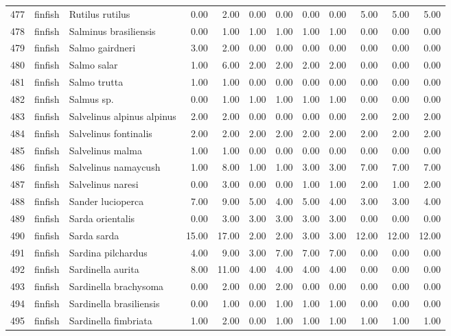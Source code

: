 \begin{table}[ht]
\begin{tabular}{rllrrrrrrrrr}
  477 & finfish & Rutilus rutilus & 0.00 & 2.00 & 0.00 & 0.00 & 0.00 & 0.00 & 5.00 & 5.00 & 5.00 \\ 
  478 & finfish & Salminus brasiliensis & 0.00 & 1.00 & 1.00 & 1.00 & 1.00 & 1.00 & 0.00 & 0.00 & 0.00 \\ 
  479 & finfish & Salmo gairdneri & 3.00 & 2.00 & 0.00 & 0.00 & 0.00 & 0.00 & 0.00 & 0.00 & 0.00 \\ 
  480 & finfish & Salmo salar & 1.00 & 6.00 & 2.00 & 2.00 & 2.00 & 2.00 & 0.00 & 0.00 & 0.00 \\ 
  481 & finfish & Salmo trutta & 1.00 & 1.00 & 0.00 & 0.00 & 0.00 & 0.00 & 0.00 & 0.00 & 0.00 \\ 
  482 & finfish & Salmus sp. & 0.00 & 1.00 & 1.00 & 1.00 & 1.00 & 1.00 & 0.00 & 0.00 & 0.00 \\ 
  483 & finfish & Salvelinus alpinus alpinus & 2.00 & 2.00 & 0.00 & 0.00 & 0.00 & 0.00 & 2.00 & 2.00 & 2.00 \\ 
  484 & finfish & Salvelinus fontinalis & 2.00 & 2.00 & 2.00 & 2.00 & 2.00 & 2.00 & 2.00 & 2.00 & 2.00 \\ 
  485 & finfish & Salvelinus malma & 1.00 & 1.00 & 0.00 & 0.00 & 0.00 & 0.00 & 0.00 & 0.00 & 0.00 \\ 
  486 & finfish & Salvelinus namaycush & 1.00 & 8.00 & 1.00 & 1.00 & 3.00 & 3.00 & 7.00 & 7.00 & 7.00 \\ 
  487 & finfish & Salvelinus naresi & 0.00 & 3.00 & 0.00 & 0.00 & 1.00 & 1.00 & 2.00 & 1.00 & 2.00 \\ 
  488 & finfish & Sander lucioperca & 7.00 & 9.00 & 5.00 & 4.00 & 5.00 & 4.00 & 3.00 & 3.00 & 4.00 \\ 
  489 & finfish & Sarda orientalis & 0.00 & 3.00 & 3.00 & 3.00 & 3.00 & 3.00 & 0.00 & 0.00 & 0.00 \\ 
  490 & finfish & Sarda sarda & 15.00 & 17.00 & 2.00 & 2.00 & 3.00 & 3.00 & 12.00 & 12.00 & 12.00 \\ 
  491 & finfish & Sardina pilchardus & 4.00 & 9.00 & 3.00 & 7.00 & 7.00 & 7.00 & 0.00 & 0.00 & 0.00 \\ 
  492 & finfish & Sardinella aurita & 8.00 & 11.00 & 4.00 & 4.00 & 4.00 & 4.00 & 0.00 & 0.00 & 0.00 \\ 
  493 & finfish & Sardinella brachysoma & 0.00 & 2.00 & 0.00 & 2.00 & 0.00 & 0.00 & 0.00 & 0.00 & 0.00 \\ 
  494 & finfish & Sardinella brasiliensis & 0.00 & 1.00 & 0.00 & 1.00 & 1.00 & 1.00 & 0.00 & 0.00 & 0.00 \\ 
  495 & finfish & Sardinella fimbriata & 1.00 & 2.00 & 0.00 & 1.00 & 1.00 & 1.00 & 1.00 & 1.00 & 1.00 \\ 

\end{tabular}
\end{table}
